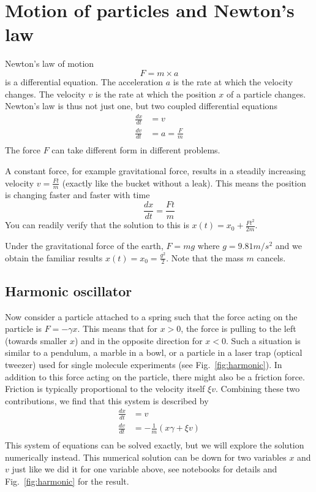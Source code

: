 \section{Motion of particles and Newton's law}
Newton's law of motion
\begin{equation}
    F = m\times a
\end{equation}
is a differential equation. The acceleration $a$ is the rate at which the velocity changes.
The velocity $v$ is the rate at which the position $x$ of a particle changes.
Newton's law is thus not just one, but two coupled differential equations
\begin{equation}
    \begin{split}
        \frac{dx}{dt} & = v \\
        \frac{dv}{dt} & = a = \frac{F}{m} \\
    \end{split}
\end{equation}
The force $F$ can take different form in different problems.

A constant force, for example gravitational force, results in a steadily increasing velocity $v = \frac{Ft}{m}$ (exactly like the bucket without a leak).
This means the position is changing faster and faster with time
\begin{equation}
    \frac{dx}{dt} = \frac{Ft}{m}
\end{equation}
You can readily verify that the solution to this is $x(t) = x_0 + \frac{Ft^2}{2m}$.

Under the gravitational force of the earth, $F = m g$ where $g = 9.81 m/s^2$ and we obtain the familiar results $x(t) = x_0 = \frac{g ^2}{2}$. Note that the mass $m$ cancels.

\subsection{Harmonic oscillator}
Now consider a particle attached to a spring such that the force acting on the particle is $F = -\gamma x$.
This means that for $x>0$, the force is pulling to the left (towards smaller $x$) and in the opposite direction for $x<0$.
Such a situation is similar to a pendulum, a marble in a bowl, or a particle in a laser trap (optical tweezer) used for single molecule experiments (see Fig.~\ref{fig:harmonic}).
In addition to this force acting on the particle, there might also be a friction force.
Friction is typically proportional to the velocity itself $\xi v$.
Combining these two contributions, we find that this system is described by
\begin{equation}
    \label{eq:harmonic}
    \begin{split}
        \frac{dx}{dt} & = v \\
        \frac{dv}{dt} & = -\frac{1}{m} \left( x\gamma +  \xi v\right)\\
    \end{split}
\end{equation}
This system of equations can be solved exactly, but we will explore the solution numerically instead.
This numerical solution can be down for two variables $x$ and $v$ just like we did it for one variable above, see notebooks for details and Fig.~\ref{fig:harmonic} for the result.

